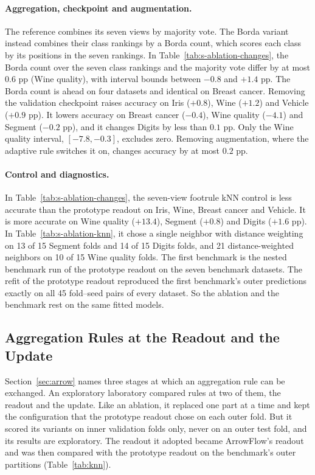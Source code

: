 \paragraph{Aggregation, checkpoint and augmentation.} The reference combines its seven views by majority vote. The Borda variant instead combines their class rankings by a Borda count, which scores each class by its positions in the seven rankings. In Table~\ref{tab:s-ablation-changes}, the Borda count over the seven class rankings and the majority vote differ by at most $0.6$ pp (Wine quality), with interval bounds between $-0.8$ and $+1.4$ pp. The Borda count is ahead on four datasets and identical on Breast cancer. Removing the validation checkpoint raises accuracy on Iris ($+0.8$), Wine ($+1.2$) and Vehicle ($+0.9$ pp). It lowers accuracy on Breast cancer ($-0.4$), Wine quality ($-4.1$) and Segment ($-0.2$ pp), and it changes Digits by less than $0.1$ pp. Only the Wine quality interval, $[-7.8,-0.3]$, excludes zero. Removing augmentation, where the adaptive rule switches it on, changes accuracy by at most $0.2$ pp.

\paragraph{Control and diagnostics.} In Table~\ref{tab:s-ablation-changes}, the seven-view footrule kNN control is less accurate than the prototype readout on Iris, Wine, Breast cancer and Vehicle. It is more accurate on Wine quality ($+13.4$), Segment ($+0.8$) and Digits ($+1.6$ pp). In Table~\ref{tab:s-ablation-knn}, it chose a single neighbor with distance weighting on 13 of 15 Segment folds and 14 of 15 Digits folds, and 21 distance-weighted neighbors on 10 of 15 Wine quality folds. The first benchmark is the nested benchmark run of the prototype readout on the seven benchmark datasets. The refit of the prototype readout reproduced the first benchmark's outer predictions exactly on all 45 fold--seed pairs of every dataset. So the ablation and the benchmark rest on the same fitted models.

\FloatBarrier
\subsection{Aggregation Rules at the Readout and the Update}\label{supp:laboratory}

Section~\ref{sec:arrow} names three stages at which an aggregation rule can be exchanged. An exploratory laboratory compared rules at two of them, the readout and the update. Like an ablation, it replaced one part at a time and kept the configuration that the prototype readout chose on each outer fold. But it scored its variants on inner validation folds only, never on an outer test fold, and its results are exploratory. The readout it adopted became ArrowFlow's readout and was then compared with the prototype readout on the benchmark's outer partitions (Table~\ref{tab:knn}).


